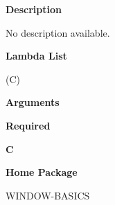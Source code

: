  
{\bf Description}

No description available.

 
{\bf Lambda List}

(C)

 
{\bf Arguments}


\beginhang
{\bf Required}\hspace{2em}
 
{\bf C}


 
\endhang
 
{\bf Home Package}

WINDOW-BASICS

